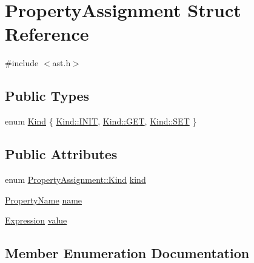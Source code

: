 \hypertarget{struct_property_assignment}{}\section{Property\+Assignment Struct Reference}
\label{struct_property_assignment}


{\ttfamily \#include $<$ast.\+h$>$}

\subsection*{Public Types}
\begin{DoxyCompactItemize}
\item 
enum \hyperlink{struct_property_assignment_a123a67b3e1b5d04a4a34b8d528e9fc96}{Kind} \{ \hyperlink{struct_property_assignment_a123a67b3e1b5d04a4a34b8d528e9fc96afaee4ca3c30ee18148ce3ada37466498}{Kind\+::\+I\+N\+IT}, 
\hyperlink{struct_property_assignment_a123a67b3e1b5d04a4a34b8d528e9fc96a7528035a93ee69cedb1dbddb2f0bfcc8}{Kind\+::\+G\+ET}, 
\hyperlink{struct_property_assignment_a123a67b3e1b5d04a4a34b8d528e9fc96a8c52684db8f49511e9b44471716bf164}{Kind\+::\+S\+ET}
 \}
\end{DoxyCompactItemize}
\subsection*{Public Attributes}
\begin{DoxyCompactItemize}
\item 
enum \hyperlink{struct_property_assignment_a123a67b3e1b5d04a4a34b8d528e9fc96}{Property\+Assignment\+::\+Kind} \hyperlink{struct_property_assignment_a7cb6c2f32adf600bb23564cfe6dc0463}{kind}
\item 
\hyperlink{ast_8h_a3a703c4a41dea6908048c9dd291d83b1}{Property\+Name} \hyperlink{struct_property_assignment_aef9a461cb355f88b21f339a613374bf0}{name}
\item 
\hyperlink{ast_8h_a4cb273a4d960cd13ea17d08f254493e8}{Expression} \hyperlink{struct_property_assignment_ab246a5637430724d0532fc07d4f04462}{value}
\end{DoxyCompactItemize}


\subsection{Member Enumeration Documentation}
\mbox{\label{struct_property_assignment_a123a67b3e1b5d04a4a34b8d528e9fc96}} 
